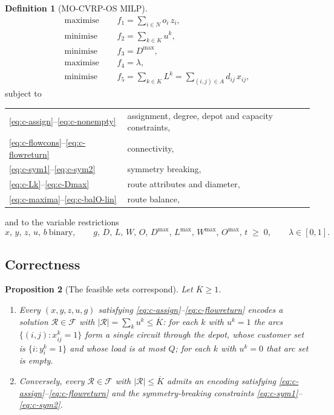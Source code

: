 \documentclass[11pt,a4paper]{article}
\theoremstyle{definition}
\newtheorem{definition}{Definition}[section]
\theoremstyle{plain}
\newtheorem{proposition}[definition]{Proposition}
\newcommand{\Feas}{\mathcal{F}}
\newcommand{\Routes}{\mathcal{R}}
\newcommand{\Arcs}{A}
\newcommand{\Cust}{N}
\newcommand{\Veh}{K}
\newcommand{\Lmax}{L^{\max}}
\newcommand{\Wmax}{W^{\max}}
\newcommand{\Omax}{O^{\max}}
\newcommand{\Dmax}{D^{\max}}
\begin{document}
\begin{definition}[\textup{\textsc{MO-CVRP-OS}} MILP]
\label{def:milp}
\begin{align}
  \text{maximise } \quad & f_1 = \sum_{i \in \Cust} o_i\, z_i, \label{eq:o1}\\
  \text{minimise } \quad & f_2 = \sum_{k \in \Veh} u^k, \label{eq:o2}\\
  \text{minimise } \quad & f_3 = \Dmax, \label{eq:o3}\\
  \text{maximise } \quad & f_4 = \lambda, \label{eq:o4}\\
  \text{minimise } \quad & f_5 = \sum_{k \in \Veh} L^k
                               = \sum_{(i,j) \in \Arcs} d_{ij}\, x_{ij},
  \label{eq:o5}
\end{align}
subject to
\begin{center}
\begin{tabular}{@{}ll@{}}
  \eqref{eq:c-assign}--\eqref{eq:c-nonempty}
    & assignment, degree, depot and capacity constraints, \\
  \eqref{eq:c-flowcons}--\eqref{eq:c-flowreturn}
    & connectivity, \\
  \eqref{eq:c-sym1}--\eqref{eq:c-sym2}
    & symmetry breaking, \\
  \eqref{eq:c-Lk}--\eqref{eq:c-Dmax}
    & route attributes and diameter, \\
  \eqref{eq:c-maxima}--\eqref{eq:c-balO-lin}
    & route balance, \\
\end{tabular}
\end{center}
and to the variable restrictions
\begin{equation}
  x,\,y,\,z,\,u,\,b \ \text{binary}, \qquad
  g,\,D,\,L,\,W,\,O,\,\Dmax,\,\Lmax,\,\Wmax,\,\Omax,\,t \;\ge\; 0, \qquad
  \lambda \in [0,1].
  \label{eq:o-domains}
\end{equation}
\end{definition}

\subsection{Correctness}
\label{sec:milp-correct}

\begin{proposition}[The feasible sets correspond]
\label{prop:validity}
Let $\overline{K} \ge 1$.
\begin{enumerate}[label=(\alph*),leftmargin=*]
\item Every $(x,y,z,u,g)$ satisfying
  \eqref{eq:c-assign}--\eqref{eq:c-flowreturn} encodes a solution
  $\Routes \in \Feas$ with $|\Routes| = \sum_{k} u^k \le \overline{K}$: for each
  $k$ with $u^k = 1$ the arcs $\{(i,j) : x^k_{ij} = 1\}$ form a single circuit
  through the depot, whose customer set is $\{i : y^k_i = 1\}$ and whose load is
  at most $Q$; for each $k$ with $u^k = 0$ that arc set is empty.
\item Conversely, every $\Routes \in \Feas$ with $|\Routes| \le \overline{K}$
  admits an encoding satisfying \eqref{eq:c-assign}--\eqref{eq:c-flowreturn}
  and the symmetry-breaking constraints \eqref{eq:c-sym1}--\eqref{eq:c-sym2}.
\end{enumerate}
\end{proposition}
\end{document}
